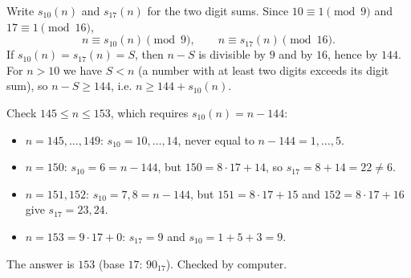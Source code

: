 Write $s_{10}(n)$ and $s_{17}(n)$ for the two digit sums. Since $10\equiv1\pmod9$ and $17\equiv1\pmod{16}$,
\[
n\equiv s_{10}(n)\pmod 9,\qquad n\equiv s_{17}(n)\pmod{16}.
\]
If $s_{10}(n)=s_{17}(n)=S$, then $n-S$ is divisible by $9$ and by $16$, hence by $144$. For $n>10$ we have $S<n$ (a number with at least two digits exceeds its digit sum), so $n-S\ge144$, i.e. $n\ge144+s_{10}(n)$.

Check $145\le n\le 153$, which requires $s_{10}(n)=n-144$:
\begin{itemize}
\item $n=145,\dots,149$: $s_{10}=10,\dots,14$, never equal to $n-144=1,\dots,5$.
\item $n=150$: $s_{10}=6=n-144$, but $150=8\cdot17+14$, so $s_{17}=8+14=22\ne6$.
\item $n=151,152$: $s_{10}=7,8=n-144$, but $151=8\cdot17+15$ and $152=8\cdot17+16$ give $s_{17}=23,24$.
\item $n=153=9\cdot17+0$: $s_{17}=9$ and $s_{10}=1+5+3=9$.
\end{itemize}
The answer is $\boxed{153}$ (base $17$: $90_{17}$). Checked by computer.
